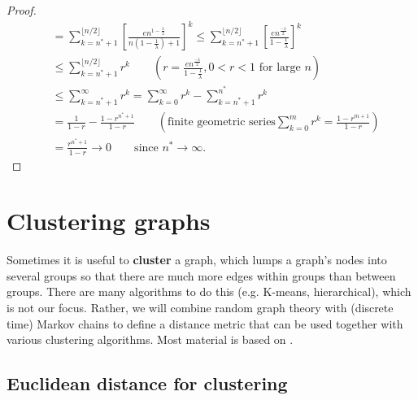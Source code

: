 \documentclass[./some_latex_template.tex]{subfiles}
\begin{document}
\begin{proof}
\begin{align*}
	&= \sum_{k=n^* + 1}^{\lfloor n/2 \rfloor} \left[\frac{en^{1 - \frac{\lambda}{2}}}{n(1 - \frac{1}{\lambda}) + 1}\right]^k \le \sum_{k=n^* + 1}^{\lfloor n/2 \rfloor} \left[\frac{en^{\frac{-\lambda}{2}}}{1 - \frac{1}{\lambda}}\right]^k\\
	&\le \sum_{k=n^* + 1}^{\lfloor n/2 \rfloor}  r^k \qquad (r = \frac{en^{\frac{-\lambda}{2}}}{1 - \frac{1}{\lambda}}, 0 < r < 1 \text{ for large }n)\\
	&\le \sum_{k=n^* + 1}^{\infty}r^k  = \sum_{k=0}^{\infty}r^k - \sum_{k=n^* + 1}^{n^*}r^k\\
	&= \frac{1}{1-r} - \frac{1-r^{n^*+1}}{1-r} \qquad (\text{finite geometric series} \sum_{k=0}^{m}r^k = \frac{1-r^{m+1}}{1-r})\\
	&= \frac{r^{n^* + 1}}{1-r} \longrightarrow 0 \qquad \text{since } n^* \rightarrow \infty.
\end{align*}
\end{proof}

\section{Clustering graphs}

Sometimes it is useful to \textbf{cluster} a graph, which lumps a graph's nodes into several groups so that there are much more edges within groups than between groups. There are many algorithms to do this (e.g. K-means, hierarchical), which is not our focus. Rather, we will combine random graph theory with (discrete time) Markov chains to define a distance metric that can be used together with various clustering algorithms. Most material is based on \cite{yen2005clustering}. 

%

\subsection{Euclidean distance for clustering}
\end{document}
